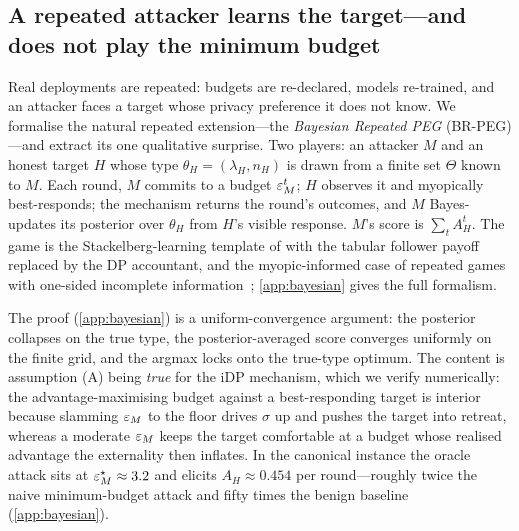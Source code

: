 \subsection{A repeated attacker learns the target---and does not play
the minimum budget}
\label{sec:brpeg}

Real deployments are repeated: budgets are re-declared, models
re-trained, and an attacker faces a target whose privacy preference it
does not know. We formalise the natural repeated extension---the
\emph{Bayesian Repeated PEG} (BR-PEG)---and extract its one
qualitative surprise. Two players: an attacker $M$ and an honest
target $H$ whose type $\theta_H = (\lambda_H, n_H)$ is drawn from a finite
set $\Theta$ known to $M$. Each round, $M$ commits to a budget
$\varepsilon_M^t$; $H$ observes it and myopically best-responds; the
mechanism returns the round's outcomes, and $M$ Bayes-updates its
posterior over $\theta_H$ from $H$'s visible response. $M$'s score is
$\sum_t A_H^t$. The game is the Stackelberg-learning template of
\citet{letchford2009learning, blum2014learning, balcan2015commitment}
with the tabular follower payoff replaced by the \ac{DP} accountant, and
the myopic-informed case of repeated games with one-sided incomplete
information~\cite{aumann1995repeated}; \cref{app:bayesian} gives the
full formalism.


The proof (\cref{app:bayesian}) is a uniform-convergence argument:
the posterior collapses on the true type, the posterior-averaged
score converges uniformly on the finite grid, and the argmax locks
onto the true-type optimum. The content is assumption (A) being
\emph{true} for the \ac{iDP} mechanism, which we verify numerically: the
advantage-maximising budget against a best-responding target is
interior because slamming $\varepsilon_M$ to the floor drives $\sigma$ up
and pushes the target into retreat, whereas a moderate $\varepsilon_M$
keeps the target comfortable at a budget whose realised advantage the
externality then inflates. In the canonical instance the oracle
attack sits at $\varepsilon_M^\star \approx 3.2$ and elicits $A_H \approx
0.454$ per round---roughly twice the naive minimum-budget attack and
fifty times the benign baseline (\cref{app:bayesian}).

